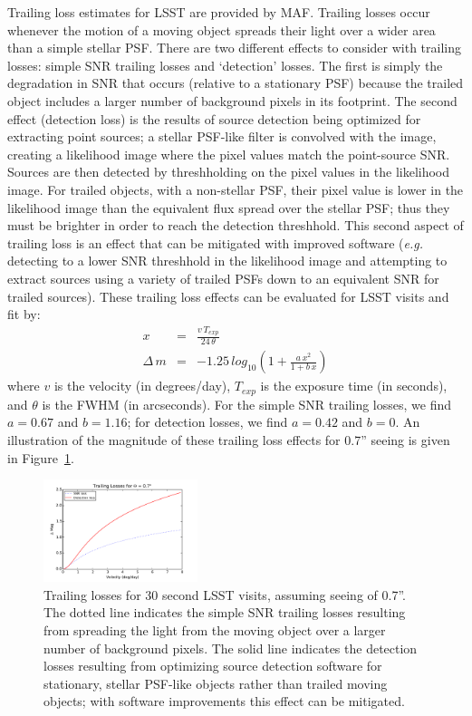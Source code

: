 \documentclass{iau}
\begin{document}
Trailing loss estimates for LSST are provided by MAF. Trailing losses
occur whenever the motion of a moving object spreads their light over
a wider area than a simple stellar PSF. There are two different
effects to consider with trailing losses: simple SNR trailing losses
and `detection' losses.  The first is simply the degradation in SNR
that occurs (relative to a stationary PSF) because the trailed object
includes a larger number of background pixels in its footprint. The
second effect (detection loss) is the results of source detection
being optimized for extracting point sources; a stellar PSF-like
filter is convolved with the image, creating a likelihood image where
the pixel values match the point-source SNR. Sources are then detected
by threshholding on the pixel values in the likelihood image. For
trailed objects, with a non-stellar PSF, their pixel value is lower in
the likelihood image than the equivalent flux spread over the stellar
PSF; thus they must be brighter in order to reach the detection
threshhold. This second aspect of trailing loss is an effect that can
be mitigated with improved software ({\it e.g.} detecting to a lower
SNR threshhold in the likelihood image and attempting to extract
sources using a variety of trailed PSFs down to an equivalent SNR for
trailed sources). These trailing loss effects can be evaluated for
LSST visits and fit by:
\begin{eqnarray}
x & = & \frac{v \, T_{exp}} {24 \, \theta} \\
\Delta \, m & = &-1.25 \, log_{10} \left( 1 + \frac{a \, x^2} { 1 + b\,
    x} \right)
\end{eqnarray}
where $v$ is the velocity (in degrees/day), $T_{exp}$ is the exposure
time (in seconds), and $\theta$ is the FWHM (in arcseconds). For the
simple SNR trailing losses, we find $a = 0.67$ and $b = 1.16$; for
detection losses, we find $a=0.42$ and $b=0$. An illustration of the
magnitude of these trailing loss effects for 0.7'' seeing is given in
Figure~\ref{trailinglosses}.

\begin{figure}
\centering
\includegraphics[width=0.4\textwidth]{trailing_losses}
\caption{Trailing losses for 30 second LSST visits, assuming seeing of
  0.7''. The dotted line indicates the simple SNR trailing losses
  resulting from spreading the light from the moving object over a
  larger number of background pixels. The solid line indicates the
  detection losses resulting from optimizing source detection software
  for stationary, stellar PSF-like objects rather than trailed moving
  objects; with software improvements this effect can be mitigated.
\label{trailinglosses}}
\end{figure}
\end{document}
